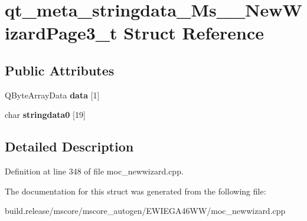 \hypertarget{structqt__meta__stringdata___ms_____new_wizard_page3__t}{}\section{qt\+\_\+meta\+\_\+stringdata\+\_\+\+Ms\+\_\+\+\_\+\+New\+Wizard\+Page3\+\_\+t Struct Reference}
\label{structqt__meta__stringdata___ms_____new_wizard_page3__t}
\subsection*{Public Attributes}
\begin{DoxyCompactItemize}
\item 
\mbox{\label{structqt__meta__stringdata___ms_____new_wizard_page3__t_ae2cb1ae274e881db66ca3ad17623510f}} 
Q\+Byte\+Array\+Data {\bfseries data} \mbox{[}1\mbox{]}
\item 
\mbox{\label{structqt__meta__stringdata___ms_____new_wizard_page3__t_a27c9bc2302e513bdb417afb176ee1ced}} 
char {\bfseries stringdata0} \mbox{[}19\mbox{]}
\end{DoxyCompactItemize}


\subsection{Detailed Description}


Definition at line 348 of file moc\+\_\+newwizard.\+cpp.



The documentation for this struct was generated from the following file\+:\begin{DoxyCompactItemize}
\item 
build.\+release/mscore/mscore\+\_\+autogen/\+E\+W\+I\+E\+G\+A46\+W\+W/moc\+\_\+newwizard.\+cpp\end{DoxyCompactItemize}
